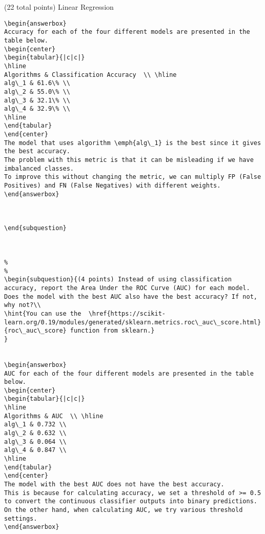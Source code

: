 \documentclass[12pt]{article}
\begin{document}
\begin{question}{(22 total points) Linear Regression}
\begin{subquestion}
\begin{answerbox}{20em}
\begin {verbatim}
\begin{answerbox}{15em}
Accuracy for each of the four different models are presented in the table below.
\begin{center}
\begin{tabular}{|c|c|}
\hline
Algorithms & Classification Accuracy  \\ \hline
alg\_1 & 61.6\% \\
alg\_2 & 55.0\% \\
alg\_3 & 32.1\% \\
alg\_4 & 32.9\% \\
\hline
\end{tabular}
\end{center}
The model that uses algorithm \emph{alg\_1} is the best since it gives the best accuracy. 
The problem with this metric is that it can be misleading if we have imbalanced classes. 
To improve this without changing the metric, we can multiply FP (False Positives) and FN (False Negatives) with different weights.
\end{answerbox}



\end{subquestion}



%
%
\begin{subquestion}{(4 points) Instead of using classification accuracy, report the Area Under the ROC Curve (AUC) for each model. 
Does the model with the best AUC also have the best accuracy? If not, why not?\\
\hint{You can use the  \href{https://scikit-learn.org/0.19/modules/generated/sklearn.metrics.roc\_auc\_score.html}{roc\_auc\_score} function from sklearn.}
}


\begin{answerbox}{15em}
AUC for each of the four different models are presented in the table below.
\begin{center}
\begin{tabular}{|c|c|}
\hline
Algorithms & AUC  \\ \hline
alg\_1 & 0.732 \\
alg\_2 & 0.632 \\
alg\_3 & 0.064 \\
alg\_4 & 0.847 \\
\hline
\end{tabular}
\end{center}
The model with the best AUC does not have the best accuracy. 
This is because for calculating accuracy, we set a threshold of >= 0.5 to convert the continuous classifier outputs into binary predictions. 
On the other hand, when calculating AUC, we try various threshold settings.
\end{answerbox}




\end{verbatim}
\end{answerbox}
\end{subquestion}
\end{question}
\end{document}
